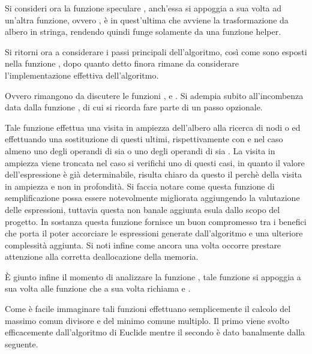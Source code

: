 \documentclass[11pt,letterpaper,twoside]{article}
\begin{document}

Si consideri ora la funzione speculare , anch'essa si
appoggia a sua volta ad un'altra funzione, ovvero , è in
quest'ultima che avviene la trasformazione da albero in stringa, rendendo quindi
 funge solamente da una funzione helper.

Si ritorni ora a considerare i passi principali dell'algoritmo, così come sono
esposti nella funzione , dopo quanto detto finora rimane da
considerare l'implementazione effettiva dell'algoritmo.


Ovvero rimangono da discutere le funzioni ,  e
. Si adempia subito all'incombenza data dalla funzione
, di cui si ricorda fare parte di un passo opzionale.


Tale funzione effettua una visita in ampiezza dell'albero alla ricerca di nodi
 o  ed effettuando una sostituzione di questi ultimi,
rispettivamente con  e  nel caso almeno uno degli
operandi di  sia  o uno degli operandi di 
sia . La visita in ampiezza viene troncata nel caso si verifichi
uno di questi casi, in quanto il valore dell'espressione è già determinabile,
risulta chiaro da questo il perchè della visita in ampiezza e non in profondità.
Si faccia notare come questa funzione di semplificazione possa essere
notevolmente migliorata aggiungendo la valutazione delle espressioni, tuttavia
questa non banale aggiunta esula dallo scopo del progetto.
In sostanza questa funzione fornisce un buon compromesso tra i benefici che
porta il poter accorciare le espressioni generate dall'algoritmo e una ulteriore
complessità aggiunta. Si noti infine come ancora una volta occorre prestare
attenzione alla corretta deallocazione della memoria.

\`E giunto infine il momento di analizzare la funzione , tale
funzione si appoggia a sua volta alle funzione  che a sua volta
richiama  e .


Come è facile immaginare tali funzioni effettuano semplicemente il calcolo del
massimo comun divisore e del minimo comune multiplo. Il primo viene svolto
efficacemente dall'algoritmo di Euclide\autocite{euclid} mentre il secondo
è dato banalmente dalla seguente.
\end{document}
